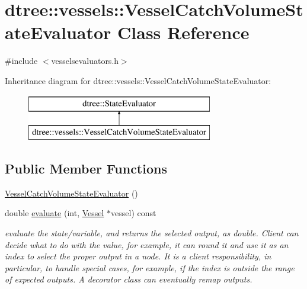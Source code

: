 \hypertarget{classdtree_1_1vessels_1_1_vessel_catch_volume_state_evaluator}{}\section{dtree\+::vessels\+::Vessel\+Catch\+Volume\+State\+Evaluator Class Reference}
\label{classdtree_1_1vessels_1_1_vessel_catch_volume_state_evaluator}


{\ttfamily \#include $<$vesselsevaluators.\+h$>$}

Inheritance diagram for dtree\+::vessels\+::Vessel\+Catch\+Volume\+State\+Evaluator\+:\begin{figure}[H]
\begin{center}
\leavevmode
\includegraphics[height=2.000000cm]{d0/dfe/classdtree_1_1vessels_1_1_vessel_catch_volume_state_evaluator}
\end{center}
\end{figure}
\subsection*{Public Member Functions}
\begin{DoxyCompactItemize}
\item 
\mbox{\hyperlink{classdtree_1_1vessels_1_1_vessel_catch_volume_state_evaluator_acbda6736db9d592c2036ae1f11a7a76d}{Vessel\+Catch\+Volume\+State\+Evaluator}} ()
\item 
double \mbox{\hyperlink{classdtree_1_1vessels_1_1_vessel_catch_volume_state_evaluator_a444c704b60274582a0258c0a9ed51893}{evaluate}} (int, \mbox{\hyperlink{class_vessel}{Vessel}} $\ast$vessel) const
\begin{DoxyCompactList}\small\item\em evaluate the state/variable, and returns the selected output, as double. Client can decide what to do with the value, for example, it can round it and use it as an index to select the proper output in a node. It is a client responsibility, in particular, to handle special cases, for example, if the index is outside the range of expected outputs. A decorator class can eventually remap outputs. \end{DoxyCompactList}\end{DoxyCompactItemize}


